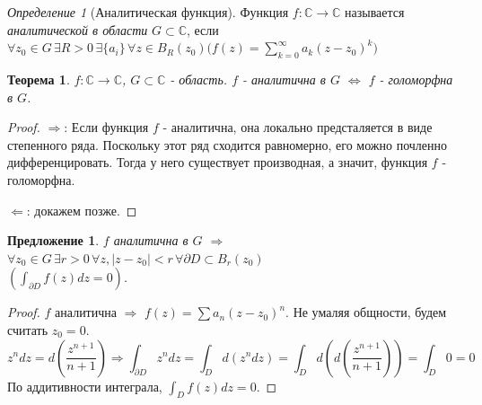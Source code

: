 \documentclass[12pt]{article}
\renewcommand{\C}{\mathbb{C}}
\newcommand{\Ra}{\Rightarrow}
\newcommand{\La}{\Leftarrow}
\renewcommand{\iff}{\Leftrightarrow}
\newcounter{cnt}
\theoremstyle{thmnote}
\newtheorem{theorem}[cnt]{Теорема}
\newtheorem{proposition}[cnt]{Предложение}
\theoremstyle{remark}
\theoremstyle{defnote}
\newtheorem{definition}[cnt]{Определение}
\begin{document}
\begin{definition}[Аналитическая функция]
    Функция $f: \C \to \C$ называется \textit{аналитической в области} $G \subset \C$, если $\forall z_0 \in G \,\exists R > 0 \,\exists \{a_i\} \,\forall z \in B_R(z_0) \big(f(z) = \sum_{k = 0}^{\infty} a_k (z - z_0)^k\big)$
\end{definition}

\begin{theorem}
\label{analit_holom}
    $f: \C \to \C$, $G \subset \C$ - область. $f$ - аналитична в $G$ $\iff$ $f$ - голоморфна в $G$.
\end{theorem}
\begin{proof}
    $\Ra$: Если функция $f$ - аналитична, она локально предсталяется в виде степенного ряда. Поскольку этот ряд сходится равномерно, его можно почленно дифференцировать. Тогда у него существует производная, а значит, функция $f$ - голоморфна.
    
    $\La$: докажем позже.
\end{proof}

\begin{proposition}
    $f$ аналитична в $G$ $\Ra$ $\forall z_0 \in G \,\exists r > 0 \,\forall z, |z - z_0| < r \,\forall \partial D \subset B_r(z_0)$\\ $\left( \int_{\partial D} f(z)dz = 0 \right)$.
\end{proposition}
\begin{proof}
    $f$ аналитична $\Ra$ $f(z) = \sum a_n (z - z_0)^n$. Не умаляя общности, будем считать $z_0 = 0$.
    \begin{equation*}
        z^n dz = d\left( \frac{z^{n+1}}{n+1} \right) \Ra \int_{\partial D} z^n dz = \int_D d(z^n dz) = \int_D d\left(d\left(\frac{z^{n+1}}{n+1}\right)\right) = \int_D 0 = 0
    \end{equation*}
    По аддитивности интеграла, $\int_D f(z)dz = 0$.
\end{proof}
\end{document}
